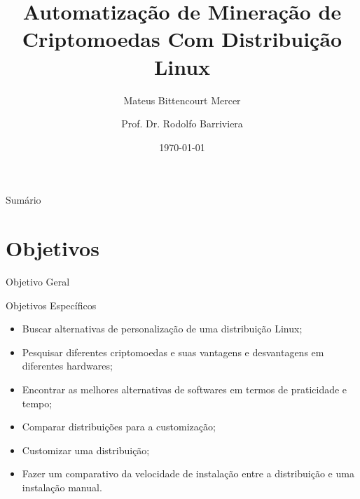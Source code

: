 \documentclass[aspectratio=43]{beamer}
\title{Automatização de Mineração de Criptomoedas Com Distribuição Linux}
\author{Mateus Bittencourt Mercer \and Prof. Dr. Rodolfo Barriviera}
\institute{Instituto Federal do Paraná Campus Londrina}
\date{\today}
\begin{document}
\begin{frame}
\titlepage
\end{frame}

\begin{frame}{Sumário}
\tableofcontents
\end{frame}

\section{Objetivos}

\begin{frame}{Objetivo Geral}

\noindent{}

\end{frame}

\begin{frame}{Objetivos Específicos}

\begin{itemize} 

    \item Buscar alternativas de personalização de uma distribuição
        Linux;

    \item Pesquisar diferentes criptomoedas e suas vantagens e
        desvantagens em diferentes hardwares;

    \item Encontrar as melhores alternativas de softwares em termos de
        praticidade e tempo;

    \item Comparar distribuições para a customização;

    \item Customizar uma distribuição;

    \item Fazer um comparativo da velocidade de instalação entre a
distribuição e uma instalação manual.

\end{itemize}
\end{frame}
\end{document}
